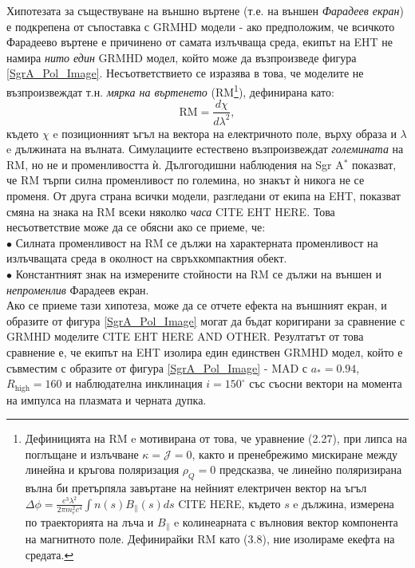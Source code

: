 Хипотезата за съществуване на външно въртене (т.е. на външен \emph{Фарадеев екран}) е подкрепена от съпоставка с GRMHD модели - ако предположим, че всичкото Фарадеево въртене е причинено от самата излъчваща среда, екипът на EHT не намира \emph{нито един} GRMHD модел, който може да възпроизведе фигура \ref{SgrA_Pol_Image}. Несъответствието се изразява в това, че моделите не възпроизвеждат т.н. \emph{мярка на въртенето} (RM\footnote{
	Дефиницията на RM e мотивирана от това, че уравнение (2.27), при липса на поглъщане и излъчване $\kappa = \mathcal{J} = 0$, както и пренебрежимо мискиране между линейна и кръгова поляризация $\rho_Q = 0$ предсказва, че линейно поляризирана вълна би претърпяла завъртане на нейният електричен вектор на ъгъл $\Delta\phi = \frac{e^3\lambda^2}{2\pi m_e^2 c^4}\int n(s)B_\parallel(s) ds$ CITE HERE, където $s$ e дължина, измерена по траекторията на лъча и $B_\parallel$ e колинеарната с вълновия вектор компонента на магнитното поле. Дефинирайки RM като (3.8), ние изолираме екефта на средата.
	}), дефинирана като:
\begin{equation}
	\text{RM} = \frac{d\chi}{d\lambda^2},
\end{equation}
където $\chi$ e позиционният ъгъл на вектора на електричното поле, върху образа и $\lambda$ e дължината на вълната. Симулациите естествено възпроизвеждат \emph{големината} на RM, но не и променливостта ѝ. Дългогодишни наблюдения на Sgr A$^*$ показват, че RM търпи силна променливост по големина, но знакът ѝ никога не се променя. От друга страна всички модели, разгледани от екипа на EHT, показват смяна на знака на RM всеки няколко \emph{часа} CITE EHT HERE. Това несъответствие може да се обясни ако се приеме, че:\\\newline
$\bullet$ Силната променливост на RM се дължи на характерната променливост на излъчващата среда в околност на свръхкомпактния обект.\\\newline
$\bullet$ Константният знак на измерените стойности на RM се дължи на външен и \emph{непроменлив} Фарадеев екран.\\

Ако се приеме тази хипотеза, може да се отчете ефекта на външният екран, и образите от фигура \ref{SgrA_Pol_Image} могат да бъдат коригирани за сравнение с GRMHD моделите CITE EHT HERE AND OTHER. Резултатът от това сравнение е, че екипът на EHT изолира един единствен GRMHD модел, който е съвместим с образите от фигура \ref{SgrA_Pol_Image} - MAD с $a_* = 0.94$, $R_\text{high} = 160$ и наблюдателна инклинация $i = 150^\circ$ със съосни вектори на момента на импулса на плазмата и черната дупка.